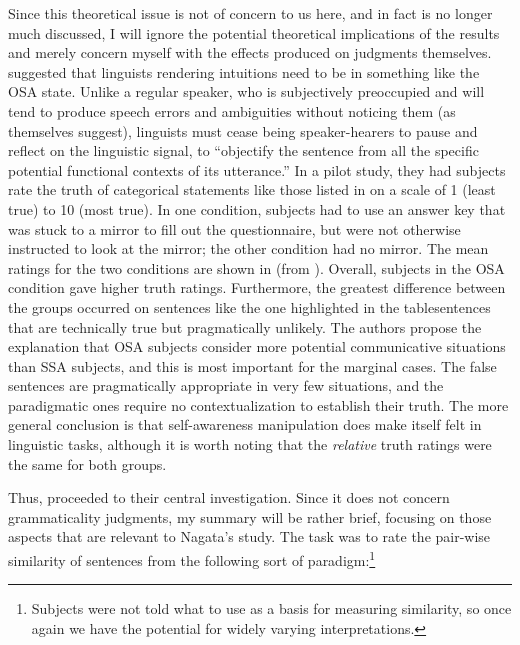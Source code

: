 Since this theoretical issue is not of concern to us here, and in fact is no longer much discussed, I will ignore the potential theoretical implications of the results and merely concern myself with the effects produced on judgments themselves. \citeauthor{CarrollEtAl1981} suggested that linguists rendering intuitions need to be in something like the OSA state. Unlike a regular speaker, who is subjectively preoccupied and will tend to produce speech errors and ambiguities without noticing them (as \citeauthor{DuvalEtAl1972} themselves suggest), linguists must cease being speaker-hearers to pause  and reflect on the linguistic signal, to ``objectify the sentence from all the specific potential functional contexts of its utterance.'' In a pilot study, they had subjects rate the truth of categorical statements like those listed in  on a scale of 1 (least true) to 10 (most true). In one condition, subjects had to use an answer key that was stuck to a mirror to fill out the questionnaire, but were not otherwise instructed to look at the mirror; the other condition had no mirror. The mean ratings for the two conditions are shown in  (from \citealt[372]{CarrollEtAl1981}). Overall, subjects in the OSA condition gave higher truth ratings. Furthermore, the greatest difference  between the groups occurred on sentences like the one highlighted in the table\schdash{}sentences that are technically true but pragmatically unlikely. The authors propose the explanation that OSA subjects consider more potential communicative situations than SSA subjects, and this is most important for the marginal cases. The false sentences are pragmatically appropriate in very few situations, and the paradigmatic ones require no contextualization to establish their truth. The more general conclusion is that self-awareness manipulation does make itself felt in linguistic tasks, although it is worth noting that the \textit{relative} truth ratings were the same for both groups.

Thus, \citeauthor{CarrollEtAl1981} proceeded  to their central investigation. Since it does not concern grammaticality judgments,  my summary will be rather
brief, focusing on those aspects that are relevant to Nagata's study. The task was to rate the pair-wise similarity of sentences from the following sort of paradigm:\footnote{Subjects were not told what to use as a basis for measuring similarity, so once again we have the potential for widely varying interpretations.}\\

